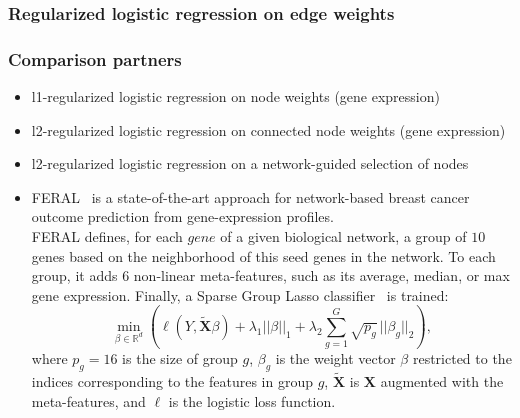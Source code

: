 \documentclass{bioinfo}
\newcommand{\xmat}{{\bm X}}
\begin{document}
\begin{methods}
\subsubsection{Regularized logistic regression on edge weights}

\subsubsection{Comparison partners}
\begin{itemize}
\item l1-regularized logistic regression on node weights (gene expression)
\item l2-regularized logistic regression on connected node weights (gene expression)
\item l2-regularized logistic regression on a network-guided selection of nodes
\item FERAL~\cite{allahyar2015} is a state-of-the-art approach for network-based breast cancer outcome prediction from gene-expression profiles.\\
FERAL defines, for each $gene$ of a given biological network, a group of $10$ genes based on the neighborhood of this seed genes in the network. To each group, it adds $6$ non-linear meta-features, such as its average, median, or max gene expression. Finally, a Sparse Group Lasso classifier~\cite{friedman2010} is trained:
  \[
  \min_{\beta \in \mathbb{R}^d} \left( \ell(Y, \tilde \xmat  \beta) + \lambda_1 || \beta||_1 + 
  \lambda_2 \sum_{g=1}^G \sqrt{p_g}\, ||\beta_g||_2 \right),
  \]
  where $p_g = 16$ is the size of group $g$, 
  $\beta_g$ is the weight vector $\beta$ restricted to the indices 
  corresponding to the features in group $g$, 
  $\tilde \xmat$ is $\xmat$ augmented with the meta-features,
  and $\ell$ is the logistic loss function.

\end{itemize}




\enlargethispage{6pt}



\end{methods}
\end{document}
